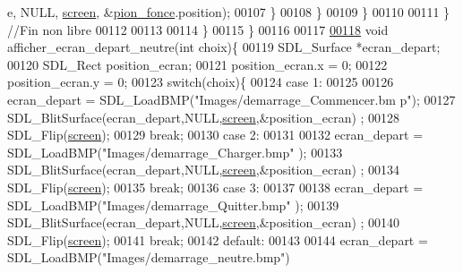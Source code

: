\begin{DoxyCode}
      e, NULL, \hyperlink{fonction_interface_8h_a78fa3957d73de49cb81d047857504218}{screen}, &\hyperlink{fonction_interface_8h_a91d0d5668d6c4d2c6cd5bbeab0f9ca15}{pion_fonce}.position);
00107                                         \}
00108                                 \}
00109                         \}
00110 
00111                 \} \textcolor{comment}{//Fin non libre}
00112 
00113 
00114         \}
00115 \}
00116 
00117 
\hypertarget{fonction_interface_8c_source_l00118}{}\hyperlink{fonction_interface_8h_afea6e76f6f28549c9c1f44636d93cb82}{00118} \textcolor{keywordtype}{void} afficher\_ecran\_depart\_neutre(\textcolor{keywordtype}{int} choix)\{
00119         SDL\_Surface *ecran\_depart;
00120         SDL\_Rect position\_ecran;
00121         position\_ecran.x = 0;
00122         position\_ecran.y = 0;
00123         \textcolor{keywordflow}{switch}(choix)\{
00124                 \textcolor{keywordflow}{case} 1:
00125 
00126                         ecran\_depart = SDL\_LoadBMP(\textcolor{stringliteral}{"Images/demarrage\_Commencer.bm
      p"});
00127                         SDL\_BlitSurface(ecran\_depart,NULL,\hyperlink{fonction_interface_8h_a78fa3957d73de49cb81d047857504218}{screen},&position\_ecran)
      ;
00128                         SDL\_Flip(\hyperlink{fonction_interface_8h_a78fa3957d73de49cb81d047857504218}{screen});
00129                         \textcolor{keywordflow}{break};
00130                 \textcolor{keywordflow}{case} 2:
00131 
00132                         ecran\_depart = SDL\_LoadBMP(\textcolor{stringliteral}{"Images/demarrage\_Charger.bmp"
      });
00133                         SDL\_BlitSurface(ecran\_depart,NULL,\hyperlink{fonction_interface_8h_a78fa3957d73de49cb81d047857504218}{screen},&position\_ecran)
      ;
00134                         SDL\_Flip(\hyperlink{fonction_interface_8h_a78fa3957d73de49cb81d047857504218}{screen});
00135                         \textcolor{keywordflow}{break};
00136                 \textcolor{keywordflow}{case} 3:
00137 
00138                         ecran\_depart = SDL\_LoadBMP(\textcolor{stringliteral}{"Images/demarrage\_Quitter.bmp"
      });
00139                         SDL\_BlitSurface(ecran\_depart,NULL,\hyperlink{fonction_interface_8h_a78fa3957d73de49cb81d047857504218}{screen},&position\_ecran)
      ;
00140                         SDL\_Flip(\hyperlink{fonction_interface_8h_a78fa3957d73de49cb81d047857504218}{screen});
00141                         \textcolor{keywordflow}{break};
00142                 \textcolor{keywordflow}{default}:
00143 
00144                         ecran\_depart = SDL\_LoadBMP(\textcolor{stringliteral}{"Images/demarrage\_neutre.bmp"})

\end{DoxyCode}
